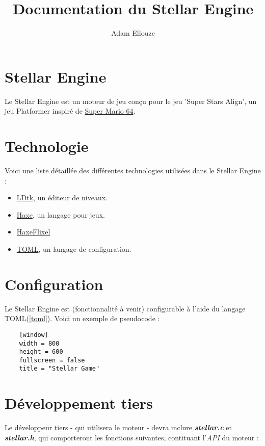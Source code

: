 \documentclass{article}
\title{Documentation du Stellar Engine}
\author{Adam Ellouze}
\numberwithin{equation}{section}    %
\begin{document}

\maketitle

\section{Stellar Engine}
    Le Stellar Engine est un moteur de jeu conçu pour le jeu 'Super Stars Align', un jeu Platformer inspiré de \href{https://en.wikipedia.org/wiki/Super_Mario_64}{Super Mario 64}. \vspace{1cm}

\section{Technologie}
    Voici une liste détaillée des différentes technologies utilisées dans le Stellar Engine :
    
    \begin{itemize}
        \item \href{https://ldtk.io/}{LDtk}, un éditeur de niveaux.
        \label{haxe} \item \href{https://haxe.org}{Haxe}, un langage pour jeux.
        \item \label{hxl} \href{https://haxeflixel.com/}{HaxeFlixel}
        \item \label{toml}  \href{https://toml.io/en/}{TOML}, un langage de configuration.    
    \end{itemize}

\section{Configuration}
    Le Stellar Engine est (fonctionnalité à venir) configurable à l'aide du langage TOML(\ref{toml}). Voici un exemple de pseudocode :
    
    
    \begin{lstlisting}
    [window]
    width = 800
    height = 600
    fullscreen = false
    title = "Stellar Game"
    \end{lstlisting}

    \section{Développement tiers}
    Le développeur tiers - qui utilisera le moteur - devra inclure \textit{\textbf{stellar.c}}  et \textit{\textbf{stellar.h}}, qui comporteront les fonctions suivantes, contituant l'\textit{API} du moteur :
\end{document}
